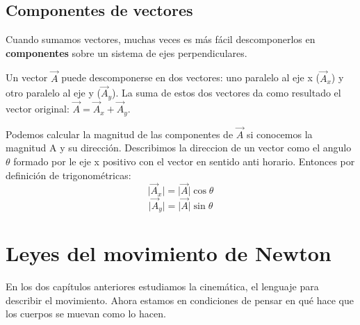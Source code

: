 \documentclass{article}
\newcommand{\newsection}[1]{
    \section{\centering \color{sectionColor} \bl{#1}}
}
\newcommand{\newsubsection}[1]{
    \subsection{\color{sectionColor} #1}
}
\newcommand{\bl}[1]{\textbf{#1}}
\begin{document}

    \newsubsection{Componentes de vectores}

    \par Cuando sumamos vectores, muchas veces es más fácil descomponerlos en \bl{componentes} sobre un sistema de ejes perpendiculares.
    \par Un vector \(\vec{A}\) puede descomponerse en dos vectores: uno paralelo al eje x (\(\vec{A}_x\)) y otro paralelo al eje y (\(\vec{A}_y\)). La suma de estos dos vectores da como resultado el vector original: \(\vec{A}=\vec{A}_x+\vec{A}_y\).

    \begin{figure}[H]
        \centering
        \shorthandoff{>}
        \shorthandon{>}
    \end{figure}

    \par Podemos calcular la magnitud de las componentes de $\vec{A}$ si conocemos la magnitud A y su dirección. Describimos la direccion de un vector como el angulo $\theta$ formado por le eje x positivo con el vector en sentido anti horario. Entonces por definición de trigonométricas:
    \[ \lvert \vec{A}_x \rvert = \lvert \vec{A} \rvert \cos \theta \]
    \[ \lvert \vec{A}_y \rvert = \lvert \vec{A} \rvert \sin \theta \]


\newsection{Leyes del movimiento de Newton}

\par En los dos capítulos anteriores estudiamos la cinemática, el lenguaje para describir el movimiento. Ahora estamos en condiciones de pensar en qué hace que los cuerpos se muevan como lo hacen.
\end{document}
